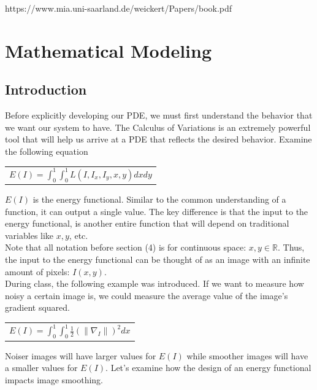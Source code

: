 \documentclass{article}
\begin{document}
  \noindent
  https://www.mia.uni-saarland.de/weickert/Papers/book.pdf\\



  \newpage
  \section{Mathematical Modeling}
  \subsection{Introduction}
  Before explicitly developing our PDE, we must first understand the behavior that we want our system to have.
  The Calculus of Variations is an extremely powerful tool that will help us arrive at a PDE that reflects
  the desired behavior. Examine the following equation
  \begin{center}
    \begin{tabular}{l}
      $E(I) = \int_{0}^{1} \int_{0}^{1} L(I, I_{x}, I_{y}, x, y) dx dy$
    \end{tabular}
  \end{center}

  \noindent
  $E(I)$ is the energy functional. Similar to the common understanding of a function, it can output
  a single value. The key difference is that the input to the energy functional, is another entire
  function that will depend on traditional variables like $x,y$, etc.\\

  \noindent
  Note that all notation before section (4) is for continuous space: $x,y \in \mathbb{R}$. Thus,
  the input to the energy functional can be thought of as an image with an infinite amount of pixels: $I(x,y)$.\\

  \noindent
  During class, the following example was introduced. If we want to measure how noisy a certain image is,
  we could measure the average value of the image's gradient squared.
  \begin{center}
    \begin{tabular}{l}
      $E(I) = \int_{0}^{1} \int_{0}^{1} \frac{1}{2} (\| \nabla_{I} \|)^{2} dx$
    \end{tabular}
  \end{center}

  \noindent
  Noiser images will have larger values for $E(I)$ while smoother images will have a smaller values for $E(I)$.
  Let's examine how the design of an energy functional impacts image smoothing.\\
\end{document}
